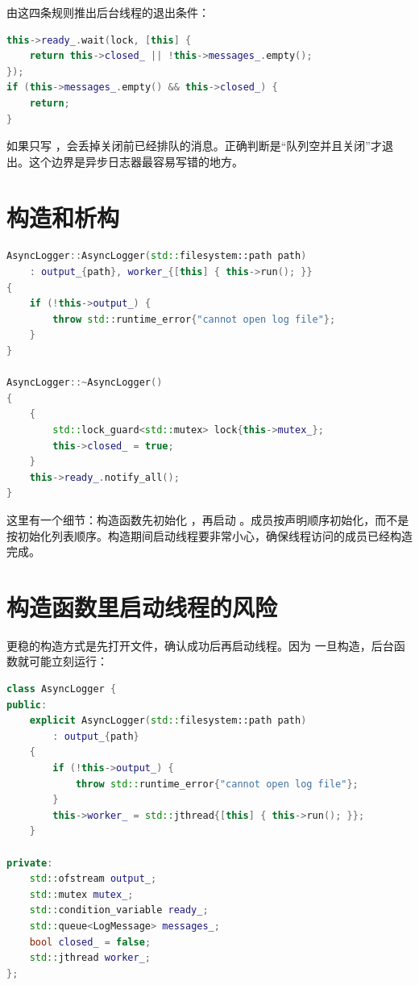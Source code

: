 由这四条规则推出后台线程的退出条件：

\begin{lstlisting}[language=C++,caption={退出条件由关闭规则推出}]
this->ready_.wait(lock, [this] {
    return this->closed_ || !this->messages_.empty();
});
if (this->messages_.empty() && this->closed_) {
    return;
}
\end{lstlisting}

如果只写 ，会丢掉关闭前已经排队的消息。正确判断是“队列空并且关闭”才退出。这个边界是异步日志器最容易写错的地方。

\section{构造和析构}

\begin{lstlisting}[language=C++,caption={构造和析构日志器}]
AsyncLogger::AsyncLogger(std::filesystem::path path)
    : output_{path}, worker_{[this] { this->run(); }}
{
    if (!this->output_) {
        throw std::runtime_error{"cannot open log file"};
    }
}

AsyncLogger::~AsyncLogger()
{
    {
        std::lock_guard<std::mutex> lock{this->mutex_};
        this->closed_ = true;
    }
    this->ready_.notify_all();
}
\end{lstlisting}

这里有一个细节：构造函数先初始化 ，再启动 。成员按声明顺序初始化，而不是按初始化列表顺序。构造期间启动线程要非常小心，确保线程访问的成员已经构造完成。

\section{构造函数里启动线程的风险}

更稳的构造方式是先打开文件，确认成功后再启动线程。因为  一旦构造，后台函数就可能立刻运行：

\begin{lstlisting}[language=C++,caption={显式 start 降低构造风险}]
class AsyncLogger {
public:
    explicit AsyncLogger(std::filesystem::path path)
        : output_{path}
    {
        if (!this->output_) {
            throw std::runtime_error{"cannot open log file"};
        }
        this->worker_ = std::jthread{[this] { this->run(); }};
    }

private:
    std::ofstream output_;
    std::mutex mutex_;
    std::condition_variable ready_;
    std::queue<LogMessage> messages_;
    bool closed_ = false;
    std::jthread worker_;
};
\end{lstlisting}

